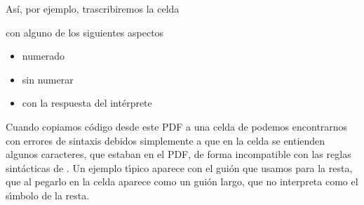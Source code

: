 Así, por ejemplo, trascribiremos la celda

\noindent con alguno de los siguientes aspectos
\footnotesize
\begin{itemize}
 \item numerado
\item sin numerar
\item con la respuesta del intérprete
\end{itemize}
\normalsize
Cuando copiamos c\'odigo desde este PDF a una celda de {\sage} podemos encontrarnos con errores de sintaxis debidos simplemente a que en la celda se entienden algunos caracteres,  que estaban en el PDF,  de forma incompatible con las reglas sint\'acticas de {\sage}. Un ejemplo t\'{\i}pico aparece con el gui\'on que usamos para la resta, que al pegarlo en la celda aparece como un gui\'on largo, que {\sage} no interpreta como el s\'{\i}mbolo de la resta. 

